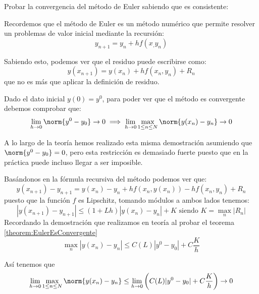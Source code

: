\begin{problem}[1]
Probar la convergencia del método de Euler sabiendo que es consistente:

\solution

Recordemos que el método de Euler es un método numérico que permite resolver un problemas de valor inicial mediante la recursión:
\[y_{n+1} = y_n + hf(x_,y_n)\]

Sabiendo esto, podemos ver que el residuo puede escribirse como:
\[y(x_{n+1}) = y(x_n) + hf(x_n,y_n) + R_n\]
que no es más que aplicar la definición de residuo.

Dado el dato inicial $y(0)=y^0$, para poder ver que el método es convergente debemos comprobar que:
\[\lim_{h \to 0 } \norm{y^0-y_0} \to 0 \implies \lim_{h\to 0} \max_{1 \leq n \leq N}\norm{y(x_n)-y_n} \to 0\]

\obs A lo largo de la teoría hemos realizado esta misma demostración asumiendo que $\norm{y^0-y_0} = 0$, pero esta restricción es demasiado fuerte puesto que en la práctica puede incluso llegar a ser imposible.

Basándonos en la fórmula recursiva del método podemos ver que:
\[y(x_{n+1}) - y_{n+1} = y(x_n) - y_n + hf(x_n,y(x_n)) -hf(x_n,y_n) + R_n\]
puesto que la función $f$ es Lipschitz, tomando módulos a ambos lados tenemos:
\[|y(x_{n+1})-y_{n+1}| \leq (1+Lh)|y(x_n)-y_n| + K \text{ siendo }K=\max_n|R_n|\]
Recordando la demostración que realizamos en teoría al probar el teorema \ref{theorem:EulerEsConvergente}
\[\max_n|y(x_n)-y_n| \leq C(L)|y^0-y_0|+C\frac{K}{h}\]

Así tenemos que 
\[\lim_{h\to 0} \max_{1 \leq n \leq N}\norm{y(x_n)-y_n} \leq \lim_{h \to 0}\left( C(L)|y^0-y_0|+C\frac{K}{h}\right) \to 0\]
\end{problem}

